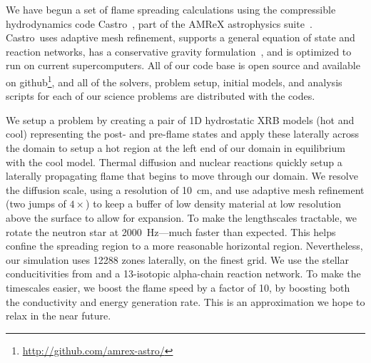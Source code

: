 \documentclass[a4paper]{jpconf}
\newcommand{\castro}{{\sffamily Castro}}
\begin{document}
We have begun a set of flame spreading calculations using the
compressible hydrodynamics code \castro~\cite{castro}, part of the
AMReX astrophysics suite~\cite{astronum:2017}.  \castro\ uses adaptive
mesh refinement, supports a general equation of state and reaction
networks, has a conservative gravity formulation~\cite{wdmergerI}, and
is optimized to run on current supercomputers.  All of our code base
is open source and available on
github\footnote{\url{http://github.com/amrex-astro/}}, and all of the
solvers, problem setup, initial models, and analysis scripts for each
of our science problems are distributed with the codes.

We setup a problem by creating a pair of 1D hydrostatic XRB models (hot and cool)
representing the post- and pre-flame states and apply these laterally
across the domain to setup a hot region at the left end of our domain
in equilibrium with the cool model.  Thermal diffusion and nuclear
reactions quickly setup a laterally propagating flame that begins to
move through our domain.  We resolve the diffusion scale, using a
resolution of 10~cm, and use adaptive mesh refinement (two jumps of
$4\times$) to keep a buffer of low density material at low resolution
above the surface to allow for expansion.  To make the lengthscales
tractable, we rotate the neutron star at 2000~Hz---much faster than
expected.  This helps confine the spreading region to a more
reasonable horizontal region.  Nevertheless, our simulation uses 12288
zones laterally, on the finest grid.  We use the stellar
conducitivities from \cite{Timmes00} and a 13-isotopic alpha-chain
reaction network.  To make the timescales easier, we boost the flame
speed by a factor of 10, by boosting both the conductivity and energy
generation rate.  This is an approximation we hope to relax in the
near future.
\end{document}

